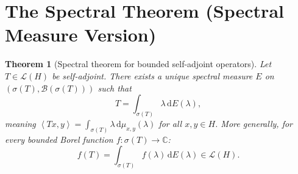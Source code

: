 \documentclass[a4paper,12pt]{book}
\newcommand{\C}{\mathbb{C}}
\newcommand{\dd}{\mathrm{d}}
\newcommand{\inner}[2]{\left\langle #1, #2 \right\rangle}
\theoremstyle{definition}
\theoremstyle{plain}
\newtheorem{theorem}[definition]{Theorem}
\theoremstyle{remark}
\begin{document}
\section{The Spectral Theorem (Spectral Measure Version)}
\label{sec:spectral-thm-measure}


\begin{theorem}[Spectral theorem for bounded self-adjoint operators]
\label{thm:spectral-thm-bounded-sa}
Let $T \in \mathcal{L}(H)$ be self-adjoint. There exists a unique spectral measure
$E$ on $(\sigma(T), \mathcal{B}(\sigma(T)))$ such that
\[
  T = \int_{\sigma(T)} \lambda\, \dd E(\lambda),
\]
meaning $\inner{Tx}{y} = \int_{\sigma(T)} \lambda\, \dd\mu_{x,y}(\lambda)$
for all $x, y \in H$. More generally, for every bounded Borel function
$f \colon \sigma(T) \to \C$:
\[
  f(T) = \int_{\sigma(T)} f(\lambda)\, \dd E(\lambda) \in \mathcal{L}(H).
\]
\end{theorem}
\end{document}
